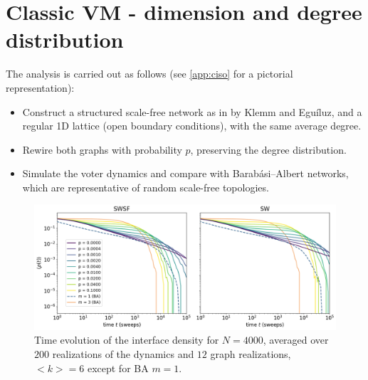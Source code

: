 \section{Classic VM - dimension and degree distribution}
The analysis is carried out as follows (see \autoref{app:ciso} for a pictorial representation):
\begin{itemize}
  \item Construct a structured scale-free network as in \cite{klemm2002highly} by Klemm and Eguíluz, and a regular 1D lattice (open boundary conditions), with the same average degree.
  \item Rewire both graphs with probability \(p\), preserving the degree distribution.
  \item Simulate the voter dynamics and compare with Barabási–Albert networks, which are representative of random scale-free topologies.
\end{itemize}


\begin{figure}[htbp]
  \centering
  \includegraphics[width=15.5cm,keepaspectratio]{images/SWSFvsSWvsBA_plot.png}
  \caption{Time evolution of the interface density for $N=4000$, averaged over $200$ realizations of the dynamics and $12$ graph realizations, $<k> = 6$ except for BA $m=1$.}
  \label{fig:yourlabel}
\end{figure}

